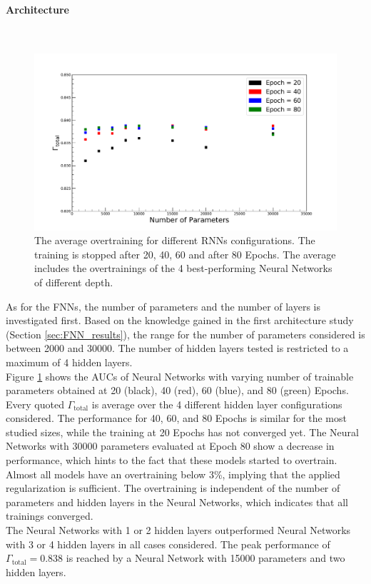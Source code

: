 \paragraph{Architecture} \mbox{} \\

\begin{figure}[H]
\centering
\includegraphics[width=\linewidth]{figs/RNN/AucPara_RNN}
\caption{The average overtraining for different RNNs configurations. The training is stopped after 20, 40, 60 and after 80 Epochs. The average includes the overtrainings of the 4 best-performing Neural Networks of different depth.}
\label{fig:ParaRNN}
\end{figure}


As for the FNNs, the number of parameters and the number of layers is investigated first. Based on the knowledge gained in the first architecture study (Section \ref{sec:FNN_results}), the range for the number of parameters considered is between 2000 and 30000. The number of hidden layers tested is restricted to a maximum of 4 hidden layers. \\
Figure \ref{fig:ParaRNN} shows the AUCs of Neural Networks with varying number of trainable parameters obtained at 20 (black), 40 (red), 60 (blue), and 80 (green) Epochs. Every quoted $\Gamma_{\text{total}}$ is average over the 4 different hidden layer configurations considered. The performance for 40, 60, and 80 Epochs is similar for the most studied sizes, while the training at 20 Epochs has not converged yet. The Neural Networks with 30000 parameters evaluated at Epoch 80 show a decrease in performance, which hints to the fact that these models started to overtrain. \\
Almost all models have an overtraining below 3\%, implying that the applied regularization is sufficient. The overtraining is independent of the number of parameters and hidden layers in the Neural Networks, which indicates that all trainings converged. \\
The Neural Networks with 1 or 2 hidden layers outperformed Neural Networks with 3 or 4 hidden layers in all cases considered. The peak performance of $\Gamma_{\text{total}} = 0.838$ is reached by a Neural Network with 15000 parameters and two hidden layers.

